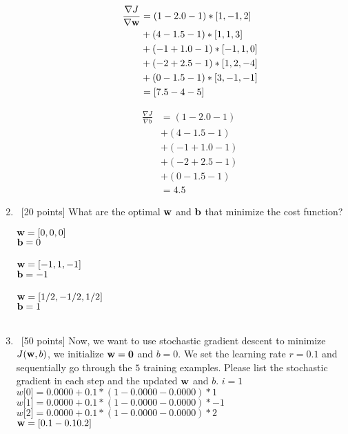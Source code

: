 \documentclass[12pt, fullpage,letterpaper]{article}
\begin{document}
\begin{enumerate}
\begin{enumerate}
\begin{align*}
    \frac{\nabla J}{\nabla {\bf w}} &=
    (1 - 2.0 - 1) * [1,-1,2]\\
    &+ (4 - 1.5 - 1) * [1,1,3]\\
    &+ (-1 + 1.0 - 1) * [-1,1,0]\\
    &+ (-2 + 2.5 - 1) * [1,2,-4]\\
    &+ (0 - 1.5 - 1) * [3,-1,-1]\\
    &= [ 7.5 -4  -5 ]
\end{align*}

\begin{align*}
    \frac{\nabla J}{\nabla b} &=
    (1 - 2.0 - 1)\\
    &+ (4 - 1.5 - 1)\\
    &+ (-1 + 1.0 - 1)\\
    &+ (-2 + 2.5 - 1)\\
    &+ (0 - 1.5 - 1)\\
    &= 4.5 %
\end{align*}

%
%



\end{enumerate}
\item~[20 points] What are the optimal ${\bf w}$ and ${\bf b}$ that minimize the cost function?

    ${\bf w} = [0,0,0]$\\
    ${\bf b} = 0$\\\\
    ${\bf w} = [-1,1,-1]$\\
    ${\bf b} = -1$\\\\
    ${\bf w} = [1/2,-1/2,1/2]$\\
    ${\bf b} = 1$\\\\

\item~[50 points] Now, we want to use stochastic gradient descent to minimize $J({\bf w}, b)$, we initialize ${\bf w} = {\bf 0}$ and $b = 0$. We set the learning rate $r = 0.1$ and sequentially go through the $5$ training examples. Please list the stochastic gradient in each step and the updated ${\bf w}$ and $b$.
$i = 1$\\
$w\big[0\big] = 0.0000 + 0.1*(1 - 0.0000 - 0.0000)*1$\\
$w\big[1\big] = 0.0000 + 0.1*(1 - 0.0000 - 0.0000)*-1$\\
$w\big[2\big] = 0.0000 + 0.1*(1 - 0.0000 - 0.0000)*2$\\
${\bf w} = [ 0.1 -0.1  0.2]$\\


\end{enumerate}
\end{document}
